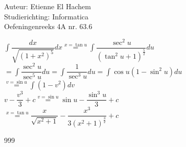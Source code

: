 \documentclass[a4paper]{article}
\begin{document}
  
\noindent \large Auteur: Etienne El Hachem \\
\noindent \large Studierichting: Informatica\\
\noindent \large Oefeningenreeks 4A nr. 63.6\\

\medskip

\normalsize

$\displaystyle\int\dfrac{dx}{\sqrt{\left(1+x^2\right)^5}}dx \stackrel{x = \tan u}{=} \displaystyle\int\dfrac{\sec^2u}{\left(\tan^2u+1\right)^{\tfrac{5}{2}}}du $\\

$ = \displaystyle\int\dfrac{\sec^2u}{\sec^5u}du = \displaystyle\int\dfrac{1}{\sec^3u}du = \displaystyle\int\cos u\left(1-\sin^2u\right)du $\\

$ \stackrel{v = \sin u}{=} \displaystyle\int\left(1-v^2\right)dv $\\

$ v - \dfrac{v^3}{3} + c \stackrel{v = \sin u}{=} \sin u - \dfrac{\sin^3u}{3} + c $\\

$ \stackrel{x = \tan u}{=} \dfrac{x}{\sqrt{x^2+1}}-\dfrac{x^3}{3\left(x^2+1\right)^{\tfrac{3}{2}}} + c $\\

\begin{thebibliography}{999}
\end{thebibliography}
\end{document}
